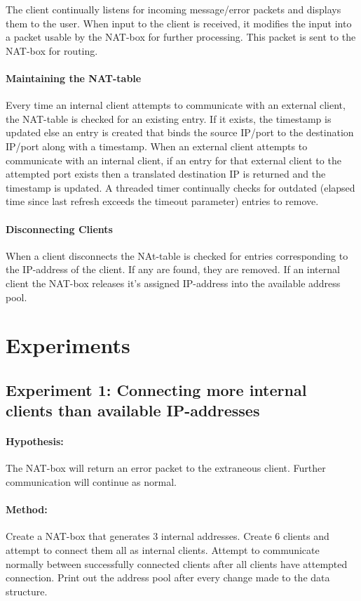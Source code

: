 \documentclass[12pt, a4paper]{article}
\begin{document}
The client continually listens for incoming message/error packets and displays them to the user. When input to the client is received, it modifies the input into a packet usable by the NAT-box for further processing. This packet is sent to the NAT-box for routing.

\paragraph{Maintaining the NAT-table}
Every time an internal client attempts to communicate with an external client, the NAT-table is checked for an existing entry. If it exists, the timestamp is updated else an entry is created that binds the source IP/port to the destination IP/port along with a timestamp. When an external client attempts to communicate with an internal client, if an entry for that external client to the attempted port exists then a translated destination IP is returned and the timestamp is updated. A threaded timer continually checks for outdated (elapsed time since last refresh exceeds the timeout parameter) entries to remove.

\paragraph{Disconnecting Clients}
When a client disconnects the NAt-table is checked for entries corresponding to the IP-address of the client. If any are found, they are removed. If an internal client the NAT-box releases it's assigned IP-address into the available address pool. 

\section{Experiments}

\subsection{Experiment 1: Connecting more internal clients than available IP-addresses}
\paragraph{Hypothesis:}
The NAT-box will return an error packet to the extraneous client. Further communication will continue as normal.
\paragraph{Method:} Create a NAT-box that generates 3 internal addresses. Create 6 clients and attempt to connect them all as internal clients. Attempt to communicate normally between successfully connected clients after all clients have attempted connection. Print out the address pool after every change made to the data structure.
\end{document}
